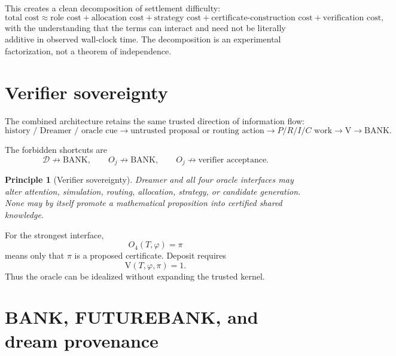 \documentclass[11pt]{article}
\newtheorem{principle}[definition]{Principle}
\newcommand{\BANK}{\mathrm{BANK}}
\newcommand{\V}{\mathrm{V}}
\newcommand{\Dream}{\mathcal D}
\begin{document}
This creates a clean decomposition of settlement difficulty:
\begin{equation}
\text{total cost}
\approx
\text{role cost}
+
\text{allocation cost}
+
\text{strategy cost}
+
\text{certificate-construction cost}
+
\text{verification cost},
\end{equation}
with the understanding that the terms can interact and need not be literally additive in observed wall-clock time. The decomposition is an experimental factorization, not a theorem of independence.

\section{Verifier sovereignty}

The combined architecture retains the same trusted direction of information flow:
\begin{equation}
\boxed{
\text{history / Dreamer / oracle cue}
\longrightarrow
\text{untrusted proposal or routing action}
\longrightarrow
P/R/I/C\text{ work}
\longrightarrow
\V
\longrightarrow
\BANK.
}
\end{equation}

The forbidden shortcuts are
\begin{equation}
\Dream\not\longrightarrow\BANK,
\qquad
O_j\not\longrightarrow\BANK,
\qquad
O_j\not\longrightarrow\text{verifier acceptance}.
\end{equation}

\begin{principle}[Verifier sovereignty]
Dreamer and all four oracle interfaces may alter attention, simulation, routing, allocation, strategy, or candidate generation. None may by itself promote a mathematical proposition into certified shared knowledge.
\end{principle}

For the strongest interface,
\begin{equation}
O_4(T,\varphi)=\pi
\end{equation}
means only that $\pi$ is a proposed certificate. Deposit requires
\begin{equation}
\V(T,\varphi,\pi)=1.
\end{equation}
Thus the oracle can be idealized without expanding the trusted kernel.

\section{BANK, FUTUREBANK, and dream provenance}
\end{document}
